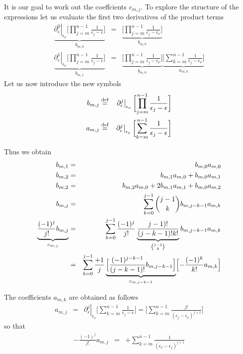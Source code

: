 \documentclass[11pt,a4paper]{report}
\begin{document}
It is our goal to work out the coeffcients $c_{m,j}$. To explore the
structure of the expressions let us evaluate the first two
derivatives of the product terms
\begin{eqnarray}
\underbrace{\left.\partial_\epsilon^{0}\right|_{\epsilon_\nu}
\biggl[\prod_{j=m}^{n-1}\frac{1}{\epsilon_j-\epsilon}\biggr]}_{b_{m,0}}
&=&
\underbrace{\biggl[\prod_{j=m}^{n-1}\frac{1}{\epsilon_j-\epsilon_\nu}\biggr]
}_{b_{m,0}}
\nonumber\\
\underbrace{\left.\partial_\epsilon^{1}\right|_{\epsilon_\nu}
\biggl[\prod_{j=m}^{n-1}\frac{1}{\epsilon_j-\epsilon}\biggr]}_{b_{m,1}}
&=&\underbrace{\biggl[\prod_{j=m}^{n-1}\frac{1}{\epsilon_j-\epsilon_\nu}\biggr]
}_{b_{m,0}}
\underbrace{\biggl[\sum_{k=m}^{n-1}\frac{1}{\epsilon_j-\epsilon_\nu}\biggr]
}_{a_{m,0}}
\label{eq:taylorphicm1}
\end{eqnarray}
Let us now introduce the new symbols
\begin{eqnarray}
b_{m,j}&\stackrel{\text{def}}{=}&\left.\partial_\epsilon^{j}\right|_{\epsilon_\nu}
\biggl[\prod_{j=m}^{n-1}\frac{1}{\epsilon_j-\epsilon}\biggr]
\nonumber\\
a_{m,j}&\stackrel{\text{def}}{=}&\left.\partial_\epsilon^{j}\right|_{\epsilon_\nu}
\biggl[\sum_{k=m}^{n-1}\frac{1}{\epsilon_j-\epsilon}\biggr]
\end{eqnarray}

Thus we obtain
\begin{eqnarray}
b_{m,1}&=&b_{m,0}a_{m,0}
\nonumber\\
b_{m,2}&=&b_{m,1}a_{m,0}+b_{m,0}a_{m,1}
\nonumber\\
b_{m,2}&=&b_{m,2}a_{m,0}+2b_{m,1}a_{m,1}+b_{m,0}a_{m,2}
\nonumber\\
b_{m,j}&=&\sum_{k=0}^{j-1}\binom{j-1}{k}b_{m,j-k-1}a_{m,k}
\nonumber\\
\underbrace{\frac{(-1)^j}{j!}b_{m,j}}_{c_{m,j}}
&=&
\sum_{k=0}^{j-1}
\frac{(-1)^j}{j!}\underbrace{\frac{j-1)!}{(j-k-1)!k!}}
_{\binom{j-1}{k}}b_{m,j-k-1}a_{m,k}
\nonumber\\
&=&
\sum_{k=0}^{j-1}
\frac{+1}{j}
\underbrace{\Bigl[\frac{(-1)^{j-k-1}}{(j-k-1)!}b_{m,j-k-1}\Bigr]}_{c_{m,j-k-1}}
\Bigl[-\frac{(-1)^k}{k!}a_{m,k}\Bigr]
\end{eqnarray}

The coefficients $a_{m,k}$ are obtained as follows
\begin{eqnarray}
a_{m,j}&=&\left.\partial_\epsilon^{j}\right|_{\epsilon_\nu}
\biggl[\sum_{k=m}^{n-1}\frac{1}{\epsilon_j-\epsilon}\biggr]
=\biggl[\sum_{k=m}^{n-1}\frac{j!}{(\epsilon_j-\epsilon_\nu)^{j+1}}\biggr]
\end{eqnarray}
so that
\begin{eqnarray}
-\frac{(-1)^j}{j!}a_{m,j}&=&
+\sum_{k=m}^{n-1}\frac{1}{(\epsilon_\nu-\epsilon_j)^{j+1}}
\end{eqnarray}
\end{document}
